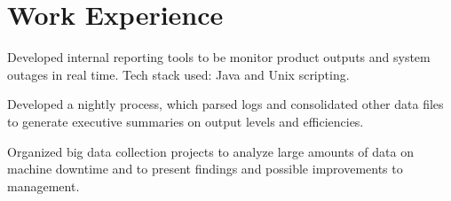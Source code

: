 \documentclass[]{deedy-resume-openfont}
\begin{document}
\begin{minipage}[t]{0.61\textwidth}
\iffalse
\runsubsection{Aircraft Avionics}
\descript{| AME-E}
\begin{tightemize} 
\item Work experience accreditation from Transport Canada.
\item Knowledge of Canadian Aviation Regulations (CARs).
\item Performed maintenance tasks on various jet aircraft including Boeing 737 and Bombardier CRJ200.
\item Performed bench testing of various electrical components.
\item Installed NAVCOM system on Bell 206A Helicopter
\item Created electrical wiring harnesses and routed it through aircraft.
\item Performed bench and operational testing on various VHF and UHF COM/NAV and GPS TX and RX.
\item Conducted all installations and tests IAW A/C electrical wiring diagrams and mechanical system schematics using various AMMs and CMMs.
\
\end{tightemize}
\sectionsep
\fi



\section{Work Experience}

{}
\begin{tightemize} 
\item Developed internal reporting tools to be monitor product outputs and system outages in real time. Tech stack used: Java and Unix scripting.
\item Developed a nightly process, which parsed logs and consolidated other data files to generate executive summaries on output levels and efficiencies.
\item Organized big data collection projects to analyze large amounts of data on machine downtime and to present findings and possible improvements to management.
\end{tightemize}
\sectionsep


\end{minipage}
\end{document}
